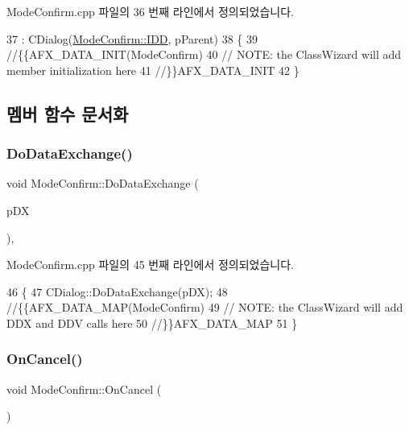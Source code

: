 Mode\+Confirm.\+cpp 파일의 36 번째 라인에서 정의되었습니다.


\begin{DoxyCode}
37   : CDialog(\mbox{\hyperlink{class_mode_confirm_a8e439d67303e9c4b5eabe35621f0b130a24889350f357e37d8f7359dfdf7b5ae5}{ModeConfirm::IDD}}, pParent)
38 \{
39   \textcolor{comment}{//\{\{AFX\_DATA\_INIT(ModeConfirm)}
40   \textcolor{comment}{// NOTE: the ClassWizard will add member initialization here}
41   \textcolor{comment}{//\}\}AFX\_DATA\_INIT}
42 \}
\end{DoxyCode}


\subsection{멤버 함수 문서화}
\mbox{\label{class_mode_confirm_a7bdff1de3b87c2d066fabf0fcb4e5211}} 
\subsubsection{\texorpdfstring{Do\+Data\+Exchange()}{DoDataExchange()}}
{\footnotesize\ttfamily void Mode\+Confirm\+::\+Do\+Data\+Exchange (\begin{DoxyParamCaption}\item[{C\+Data\+Exchange $\ast$}]{p\+DX }\end{DoxyParamCaption})\hspace{0.3cm}{\ttfamily [protected]}, {\ttfamily [virtual]}}



Mode\+Confirm.\+cpp 파일의 45 번째 라인에서 정의되었습니다.


\begin{DoxyCode}
46 \{
47   CDialog::DoDataExchange(pDX);
48   \textcolor{comment}{//\{\{AFX\_DATA\_MAP(ModeConfirm)}
49   \textcolor{comment}{// NOTE: the ClassWizard will add DDX and DDV calls here}
50   \textcolor{comment}{//\}\}AFX\_DATA\_MAP}
51 \}
\end{DoxyCode}
\mbox{\label{class_mode_confirm_a5933e4703c9d0af9747384a61f994804}} 
\subsubsection{\texorpdfstring{On\+Cancel()}{OnCancel()}}
{\footnotesize\ttfamily void Mode\+Confirm\+::\+On\+Cancel (\begin{DoxyParamCaption}{ }\end{DoxyParamCaption})\hspace{0.3cm}{\ttfamily [protected]}}



